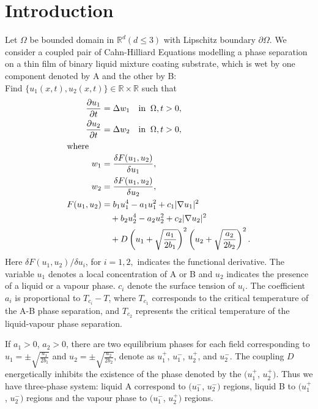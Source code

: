 \setcounter{equation}{0}
\chapter{Introduction}

Let $\Omega$ be bounded domain in ${\mathbb R}^d (d\leq3)$ with
Lipschitz boundary $\partial\Omega.$  We consider a coupled pair of
Cahn-Hilliard Equations modelling a phase separation on a thin
film of binary liquid mixture coating substrate, which is wet by one
component denoted by A and the other by B:\\
Find $\{u_1(x,t),u_2(x,t)\}\in {\mathbb R}\times {\mathbb R}$ such
that
\eqlabon 
\begin{align} 
\frac{\partial u_{1}}{\partial t}&  = \Delta w_{1} \quad  \mbox{in}\;\;\Omega,t>0, \label{1a0001a}\\ 
\frac{\partial u_{2}}{\partial t}&  = \Delta w_{2} \quad \mbox{in}\;\;\Omega,t>0 ,\label{1a0001b}\\
\intertext{where}
w_{1}  &=  \frac{\delta F(u_{1},u_{2})}{\delta u_{1}}, \label{1a0001c}\\
w_{2}  &=  \frac{\delta F(u_{1},u_{2})}{\delta u_{2}},\label{1a0001d}\\ 
F(u_{1},u_{2})   &=   b_1u_1^4- a_1u_1^2+c_1|\nabla u_1|^2 \nonumber\\
   &\quad  + b_2u_2^4-  a_2u_2^2+c_2|\nabla u_2|^2 \nonumber\\
   &\quad  + D \left(u_1+ \sqrt{\frac{a_1}{2b_1}}\right )^2  \left(u_2+
       \sqrt{\frac{a_2}{2b_2}}\right)^2.\label{1a0001e}
\end{align}
Here ${\delta F}(u_{1},u_{2})/{\delta u_{i}}$, for $i=1,2,$ indicates the functional derivative.
The variable $u_1$ denotes a local concentration of A or B and $u_2$ indicates
the presence of a liquid or a vapour phase. $c_i$ denote the surface
tension of $u_i$.  The coefficient $a_i$ is proportional
to $T_{c_i}-T$, where $T_{c_1}$ corresponds to the critical
temperature of the A-B phase separation, and $T_{c_2}$ represents the critical
temperature of the
liquid-vapour phase separation.
\eqlaboff


If $a_1>0$, $ a_2 >0$, there
are two equilibrium phases for each field corresponding to $u_1 = \pm
\sqrt{\frac{a_1}{2b_1}}$ and $u_2 = \pm \sqrt{\frac{a_2}{2b_2}}$,
denote as $u_1^+$, $u_1^-$, $u_2^+$, and $u_2^-$.  The coupling $D$
energetically inhibits the existence of the phase denoted by the
$(u_1^+$, $u_2^+)$.  Thus we have three-phase system: liquid A
correspond to $(u_1^-$, $u_2^-)$ regions, liquid B to $(u_1^+$,
$u_2^-)$ regions and the vapour phase to $(u_1^-$, $u_2^+)$ regions.

